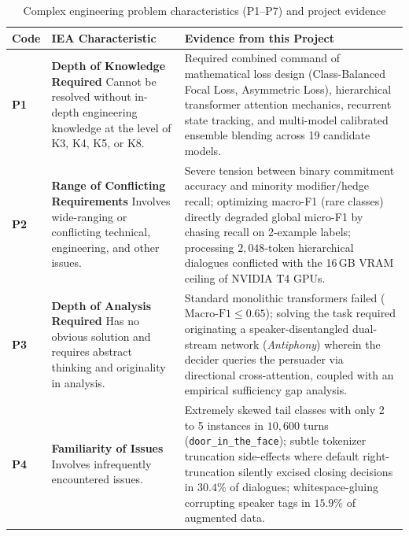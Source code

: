 \begin{table}[htbp]
  \centering
  \small
  \caption{Complex engineering problem characteristics (P1--P7) and project evidence}
  \label{tab:complexity}
  \begin{tabularx}{\textwidth}{l>{\hsize}Y>{\hsize}Y}
    \toprule
    \textbf{Code} & \textbf{IEA Characteristic} & \textbf{Evidence from this Project} \\
    \midrule
    \textbf{P1} & \textbf{Depth of Knowledge Required} \newline Cannot be resolved without in-depth engineering knowledge at the level of K3, K4, K5, or K8. & Required combined command of mathematical loss design (Class-Balanced Focal Loss, Asymmetric Loss), hierarchical transformer attention mechanics, recurrent state tracking, and multi-model calibrated ensemble blending across 19 candidate models. \\
    \midrule
    \textbf{P2} & \textbf{Range of Conflicting Requirements} \newline Involves wide-ranging or conflicting technical, engineering, and other issues. & Severe tension between binary commitment accuracy and minority modifier/hedge recall; optimizing macro-F1 (rare classes) directly degraded global micro-F1 by chasing recall on 2-example labels; processing $2{,}048$-token hierarchical dialogues conflicted with the 16\,GB VRAM ceiling of NVIDIA T4 GPUs. \\
    \midrule
    \textbf{P3} & \textbf{Depth of Analysis Required} \newline Has no obvious solution and requires abstract thinking and originality in analysis. & Standard monolithic transformers failed ($\text{Macro-F1} \le 0.65$); solving the task required originating a speaker-disentangled dual-stream network (\textit{Antiphony}) wherein the decider queries the persuader via directional cross-attention, coupled with an empirical sufficiency gap analysis. \\
    \midrule
    \textbf{P4} & \textbf{Familiarity of Issues} \newline Involves infrequently encountered issues. & Extremely skewed tail classes with only 2 to 5 instances in $10{,}600$ turns (\texttt{door\_in\_the\_face}); subtle tokenizer truncation side-effects where default right-truncation silently excised closing decisions in $30.4\%$ of dialogues; whitespace-gluing corrupting speaker tags in $15.9\%$ of augmented data. \\

\end{tabularx}
\end{table}
